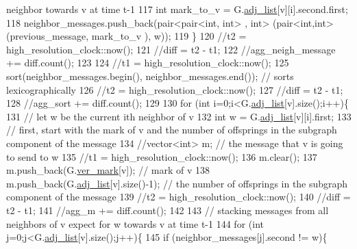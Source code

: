 \begin{DoxyCode}
{       neighbor towards v at time t-1}
117           \textcolor{keywordtype}{int} mark\_to\_v = G.\hyperlink{classmarked__graph_a1a0bf7ca413a278763f7c878b3b6fd6f}{adj\_list}[v][i].second.first;
118           neighbor\_messages.push\_back(pair<pair<int, int> , \textcolor{keywordtype}{int}> (pair<int,int>(previous\_message, mark\_to\_v
      ), w));
119         \}
120         \textcolor{comment}{//t2 = high\_resolution\_clock::now();}
121         \textcolor{comment}{//diff = t2 - t1;}
122         \textcolor{comment}{//agg\_neigh\_message += diff.count();}
123 
124         \textcolor{comment}{//t1 = high\_resolution\_clock::now();}
125         sort(neighbor\_messages.begin(), neighbor\_messages.end()); \textcolor{comment}{// sorts lexicographically}
126         \textcolor{comment}{//t2 = high\_resolution\_clock::now();}
127         \textcolor{comment}{//diff = t2 - t1;}
128         \textcolor{comment}{//agg\_sort += diff.count();}
129 
130         \textcolor{keywordflow}{for} (\textcolor{keywordtype}{int} i=0;i<G.\hyperlink{classmarked__graph_a1a0bf7ca413a278763f7c878b3b6fd6f}{adj\_list}[v].size();i++)\{
131           \textcolor{comment}{// let w be the current ith neighbor of v}
132           \textcolor{keywordtype}{int} w = G.\hyperlink{classmarked__graph_a1a0bf7ca413a278763f7c878b3b6fd6f}{adj\_list}[v][i].first;
133           \textcolor{comment}{// first, start with the mark of v and the number of offsprings in the subgraph component of the
       message}
134           \textcolor{comment}{//vector<int> m; // the message that v is going to send to w}
135           \textcolor{comment}{//t1 = high\_resolution\_clock::now();}
136           m.clear();
137           m.push\_back(G.\hyperlink{classmarked__graph_ac83e9377dd4d8bb95be1ac949b127296}{ver\_mark}[v]); \textcolor{comment}{// mark of v}
138           m.push\_back(G.\hyperlink{classmarked__graph_a1a0bf7ca413a278763f7c878b3b6fd6f}{adj\_list}[v].size()-1); \textcolor{comment}{// the number of offsprings in the subgraph
       component of the message}
139           \textcolor{comment}{//t2 = high\_resolution\_clock::now();}
140           \textcolor{comment}{//diff = t2 - t1;}
141           \textcolor{comment}{//agg\_m += diff.count();}
142 
143           \textcolor{comment}{// stacking messages from all neighbors of v expect for w towards v at time t-1}
144           \textcolor{keywordflow}{for} (\textcolor{keywordtype}{int} j=0;j<G.\hyperlink{classmarked__graph_a1a0bf7ca413a278763f7c878b3b6fd6f}{adj\_list}[v].size();j++)\{
145             \textcolor{keywordflow}{if} (neighbor\_messages[j].second != w)\{

\end{DoxyCode}

